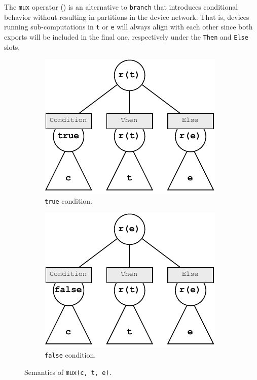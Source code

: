 The \texttt{mux} operator () is an alternative to \texttt{branch} that introduces conditional behavior without resulting in partitions in the device network.
%
That is, devices running sub-computations in \texttt{t} or \texttt{e} will always align with each other since both exports will be included in the final one, respectively under the \texttt{Then} and \texttt{Else} slots.
%
\begin{figure}
    \centering
    \begin{subfigure}[b]{0.47\textwidth}
        \centering
        \includegraphics[width=\textwidth]{figures/semantics/mux-true.pdf}
        \caption{\texttt{true} condition.}
        \label{fig:semantics-mux-true}
    \end{subfigure}
    \begin{subfigure}[b]{0.47\textwidth}
        \centering
        \includegraphics[width=\textwidth]{figures/semantics/mux-false.pdf}
        \caption{\texttt{false} condition.}
        \label{fig:semantics-mux-false}
    \end{subfigure}
    \caption{Semantics of \texttt{mux(c, t, e)}.}
    \label{fig:semantics-mux}
\end{figure}

